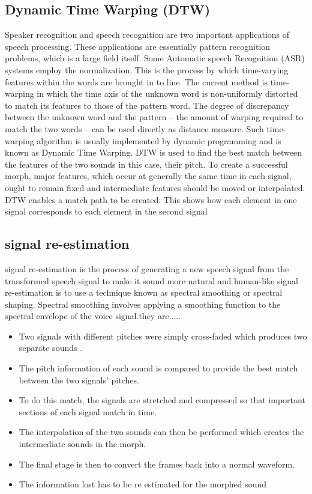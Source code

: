 \documentclass[12pt]{report}
\begin{document}
\subsection{Dynamic Time Warping (DTW)}
Speaker  recognition  and  speech  recognition  are  two  important  applications  of  speech  processing. These applications are essentially pattern recognition problems, which is a large field itself. Some Automatic speech  Recognition  (ASR)  systems  employ  the  normalization.  This  is  the  process  by  which  time-varying features within the words are brought in to line. The current method is time-warping in which the time axis of the unknown word is non-uniformly distorted to match its features to those of the pattern word. The degree of discrepancy between the unknown word and the pattern – the amount of warping required to match the two words – can be used directly as distance measure.
\newline
 Such  time-warping  algorithm  is  usually  implemented  by  dynamic  programming  and  is  known  as Dynamic Time Warping. DTW is used to find the best match between the features of the two sounds in this case, their pitch. To create a successful morph, major features, which occur at generally the same time in each signal, ought to remain fixed and intermediate features should be moved or interpolated. DTW enables a match path to be created.  This shows how each element in one signal corresponds to each element in the second signal

\subsection{signal re-estimation}


signal re-estimation is the process of generating a new speech signal from the transformed speech signal to make it sound more natural and human-like
signal re-estimation is to use a technique known as spectral smoothing or spectral shaping. Spectral smoothing involves applying a smoothing function to the spectral envelope of the voice signal.they are.....
\newline
\begin{itemize}
\item Two signals with different pitches
were simply cross-faded which
produces two separate sounds .
\item The pitch information of each
sound is compared to provide the
best match between the two
signals' pitches.

\item To do this match, the signals are
stretched and compressed so that
important sections of each signal
match in time.

\item The interpolation of the two
sounds can then be performed
which creates the intermediate
sounds in the morph.

\item The final stage is then to convert
the frames back into a normal
waveform.

\item The information lost has to be re
estimated for the morphed sound
\end{itemize}
\end{document}
